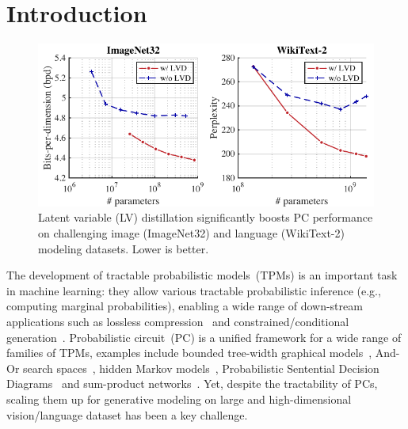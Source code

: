 \documentclass{article} %
\newcommand{\guy}[1]{\textcolor{blue}{\textbf{[Guy: #1]}}}
\begin{document}
\section{Introduction}
\label{sec:intro}

\begin{figure}
    \centering
    \vspace{-1.2em}
    \includegraphics[width=0.6\columnwidth]{figures/fig-overview-results.pdf}
    \vspace{-2.0em}
    \caption{Latent variable (LV) distillation significantly boosts PC performance on challenging image (ImageNet32) and language (WikiText-2) modeling datasets. Lower is better.}
    \label{fig:overview-res}
    \vspace{-0.6em}
\end{figure}

The development of tractable probabilistic models~(TPMs) is an important task in machine learning: they allow various tractable probabilistic inference (e.g., computing marginal probabilities), enabling a wide range of down-stream applications such as lossless compression~\citep{liu2022lossless} and constrained/conditional generation~\citep{peharz2020einsum}. Probabilistic circuit~(PC) is a unified framework for a wide range of families of TPMs, examples include bounded tree-width graphical models~\citep{meila2000learning}, And-Or search spaces~\citep{marinescu2005and}, hidden Markov models~\citep{rabiner1986introduction}, Probabilistic Sentential Decision Diagrams~\citep{kisa2014probabilistic} and sum-product networks~\citep{poon2011sum}. Yet, despite the tractability of PCs, scaling them up for generative modeling on large and high-dimensional vision/language dataset has been a key challenge. 

\end{document}

